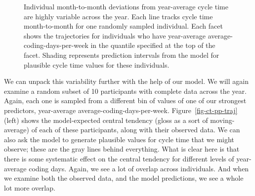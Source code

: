 \documentclass[manuscript,screen,review]{acmart}
\begin{document}
\begin{figure}


\caption[Individual month-to-month deviations from year-average cycle
time are highly variable across the
year]{\label{fig-wi-ct-traj}Individual month-to-month deviations from
year-average cycle time are highly variable across the year. Each line
tracks cycle time month-to-month for one randomly sampled individual.
Each facet shows the trajectories for individuals who have year-average
average-coding-days-per-week in the quantile specified at the top of the
facet. Shading represents prediction intervals from the model for
plausible cycle time values for these individuals.}

\end{figure}%

We can unpack this variability further with the help of our model. We
will again examine a random subset of 10 participants with complete data
across the year. Again, each one is sampled from a different bin of
values of one of our strongest predictors, year-average
average-coding-days-per-week. Figure~\ref{fig-ct-pp-traj} (left) shows
the model-expected central tendency (gloss as a sort of moving-average)
of each of these participants, along with their observed data. We can
also ask the model to generate plausible values for cycle time that we
might observe; these are the gray lines behind everything. What is clear
here is that there is some systematic effect on the central tendency for
different levels of year-average coding days. Again, we see a lot of
overlap across individuals. And when we examine both the observed data,
and the model predictions, we see a whole lot more overlap.
\end{document}

